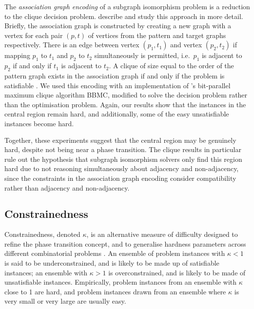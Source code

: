 \documentclass[twoside,11pt]{article}
\begin{document}
The \emph{association graph encoding} of a subgraph isomorphism problem is a reduction to the clique
decision problem.  describe and study this approach in more
detail. Briefly, the association graph is constructed by creating a new graph with a vertex for each
pair $(p, t)$ of vertices from the pattern and target graphs respectively. There is an edge between
vertex $(p_1, t_1)$ and vertex $(p_2, t_2)$ if mapping $p_1$ to $t_1$ and $p_2$ to $t_2$
simultaneously is permitted, i.e.\ $p_1$ is adjacent to $p_2$ if and only if $t_1$ is adjacent to
$t_2$. A clique of size equal to the order of the pattern graph exists in the association graph if
and only if the problem is satisfiable \cite{o:Levi73}. We used this encoding with an
implementation of 's bit-parallel maximum clique algorithm
BBMC, modified to solve the decision problem rather than the optimisation problem.  Again, our
results show that the instances in the central region remain hard, and additionally, some of the
easy unsatisfiable instances become hard.

Together, these experiments suggest that the central region may be genuinely hard, despite not being
near a phase transition. The clique results in particular rule out the hypothesis that subgraph
isomorphism solvers only find this region hard due to not reasoning simultaneously about adjacency
and non-adjacency, since the constraints in the association graph encoding consider compatibility
rather than adjacency and non-adjacency.

\subsection{Constrainedness}

Constrainedness, denoted $\kappa$, is an alternative measure of difficulty designed to refine the
phase transition concept, and to generalise hardness parameters across different combinatorial
problems \cite{DBLP:conf/aaai/GentMPW96}. An ensemble of problem instances with $\kappa < 1$ is
said to be underconstrained, and is likely to be made up of satisfiable instances; an ensemble with
$\kappa > 1$ is overconstrained, and is likely to be made of unsatisfiable instances. Empirically,
problem instances from an ensemble with $\kappa$ close to 1 are hard, and problem instances drawn
from an ensemble where $\kappa$ is very small or very large are usually easy.
\end{document}
